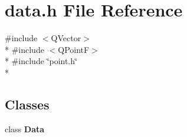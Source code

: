 \section{data.\+h File Reference}
\label{bk3_2curve_2data_8h}
{\ttfamily \#include $<$Q\+Vector$>$}\\*
{\ttfamily \#include $<$Q\+PointF$>$}\\*
{\ttfamily \#include \char`\"{}point.\+h\char`\"{}}\\*
\subsection*{Classes}
\begin{DoxyCompactItemize}
\item 
class {\bf Data}
\end{DoxyCompactItemize}
